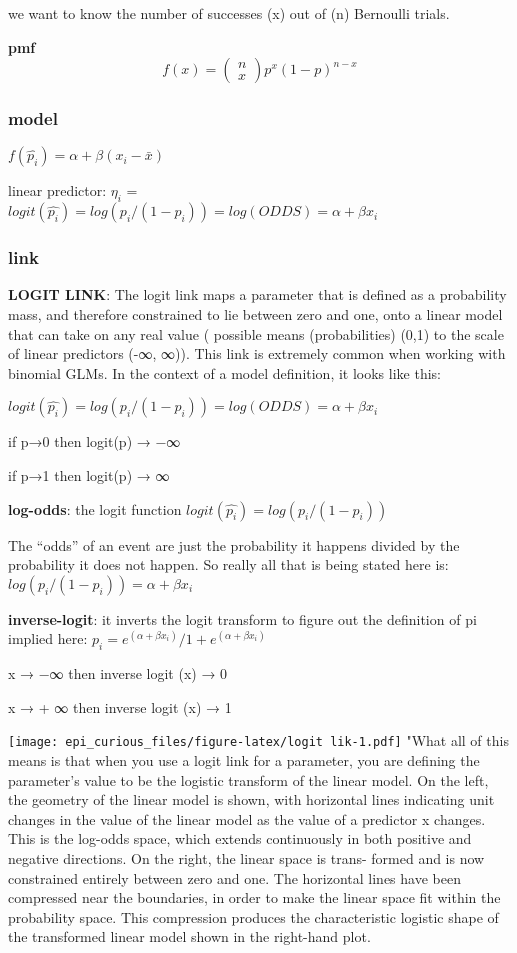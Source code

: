 \documentclass[
]{article}
\begin{document}
we want to know the number of successes (x) out of (n) Bernoulli trials.

\textbf{pmf}
\[f(x)= \begin{pmatrix} n\\x \end{pmatrix} p^x (1-p)^{n-x}\]

\hypertarget{model-1}{%
\subsubsection{model}\label{model-1}}

\(f(\hat{p_i})=\alpha +\beta(x_i-\bar{x})\)

linear predictor: \(\eta_i\) =
\(logit(\hat{p_i}) = log(p_i/(1-p_i)) = log(ODDS) =\alpha +\beta x_i\)

\hypertarget{link-1}{%
\subsubsection{link}\label{link-1}}

\textbf{LOGIT LINK}: The logit link maps a parameter that is defined as
a probability mass, and therefore constrained to lie between zero and
one, onto a linear model that can take on any real value ( possible
means (probabilities) (0,1) to the scale of linear predictors (-∞, ∞)).
This link is extremely common when working with binomial GLMs. In the
context of a model definition, it looks like this:

\(logit(\hat{p_i}) = log(p_i/(1-p_i)) = log(ODDS) =\alpha +\beta x_i\)

if p→0 then logit(p) → −∞

if p→1 then logit(p) → ∞

\textbf{log-odds}: the logit function
\(logit(\hat{p_i}) = log(p_i/(1-p_i))\)

The ``odds'' of an event are just the probability it happens divided by
the probability it does not happen. So really all that is being stated
here is: \(log(p_i/(1-p_i))= \alpha +\beta x_i\)

\textbf{inverse-logit}: it inverts the logit transform to figure out the
definition of pi implied here:
\(p_i = e^{(\alpha +\beta x_i)} / 1 + e^{(\alpha +\beta x_i)}\)

x → −∞ then inverse logit (x) → 0

x → + ∞ then inverse logit (x) → 1

\texttt{[image: epi\_curious\_files/figure-latex/logit lik-1.pdf]} "What
all of this means is that when you use a logit link for a parameter, you
are defining the parameter's value to be the logistic transform of the
linear model. On the left, the geometry of the linear model is shown,
with horizontal lines indicating unit changes in the value of the linear
model as the value of a predictor x changes. This is the log-odds space,
which extends continuously in both positive and negative directions. On
the right, the linear space is trans- formed and is now constrained
entirely between zero and one. The horizontal lines have been compressed
near the boundaries, in order to make the linear space fit within the
probability space. This compression produces the characteristic logistic
shape of the transformed linear model shown in the right-hand plot.
\end{document}
